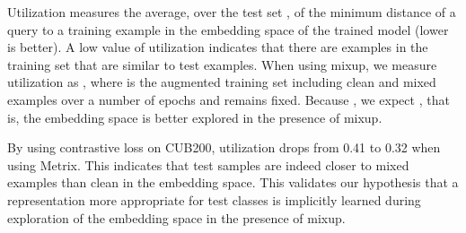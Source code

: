 \documentclass{article}
\begin{document}
Utilization measures the average, over the test set , of the minimum distance of a query  to a training example  in the embedding space of the trained model  (lower is better). A low value of utilization indicates that there are examples in the training set that are similar to test examples. When using mixup, we measure utilization as , where  is the augmented training set including clean and mixed examples over a number of epochs and  remains fixed. Because , we expect , that is, the embedding space is better explored in the presence of mixup. 

By using contrastive loss on CUB200, utilization drops from 0.41 to 0.32 when using Metrix. This indicates that test samples are indeed closer to mixed examples than clean in the embedding space. This validates our hypothesis that a representation more appropriate for test classes is implicitly learned during exploration of the embedding space in the presence of mixup.
\end{document}
